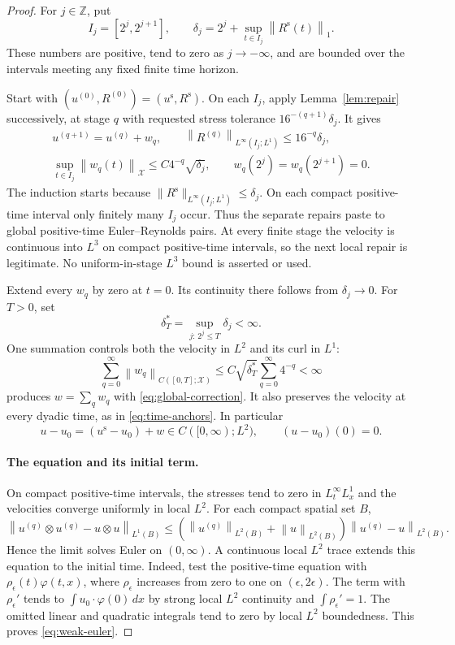\documentclass[11pt,a4paper,reqno]{amsart}
\theoremstyle{plain}
\theoremstyle{definition}
\theoremstyle{remark}
\numberwithin{equation}{section}
\newcommand{\X}{\mathcal X}
\newcommand{\norm}[2]{\left\|#1\right\|_{#2}}
\newcommand{\dd}{\,dx}
\begin{document}
\begin{proof}
For $j\in\mathbb Z$, put
\[
 I_j=[2^j,2^{j+1}],\qquad
 \delta_j=2^j+\sup_{t\in I_j}\norm{R^{\mathrm s}(t)}1.
\]
These numbers are positive, tend to zero as $j\to-\infty$, and are
bounded over the intervals meeting any fixed finite time horizon.

Start with $(u^{(0)},R^{(0)})=(u^{\mathrm s},R^{\mathrm s})$.
On each $I_j$, apply Lemma~\ref{lem:repair} successively, at stage $q$
with requested stress tolerance $16^{-(q+1)}\delta_j$. It gives
\begin{equation}\label{eq:dyadic-induction}
 \begin{gathered}
 u^{(q+1)}=u^{(q)}+w_q,\qquad
 \norm{R^{(q)}}{L^\infty(I_j;L^1)}\le16^{-q}\delta_j,\\
 \sup_{t\in I_j}\norm{w_q(t)}\X\le C4^{-q}\sqrt{\delta_j},
 \qquad w_q(2^j)=w_q(2^{j+1})=0.
 \end{gathered}
\end{equation}
The induction starts because $\|R^{\mathrm s}\|_{L^\infty(I_j;L^1)}
\le \delta_j$. On each compact positive-time interval only finitely many
$I_j$ occur. Thus the separate repairs paste to global positive-time
Euler--Reynolds pairs. At every finite stage the velocity is continuous
into $L^3$ on compact positive-time intervals, so the next local repair
is legitimate. No uniform-in-stage $L^3$ bound is asserted or used.

Extend every $w_q$ by zero at $t=0$. Its continuity there follows from
$\delta_j\to0$. For $T>0$, set
\[
 \delta_T^*=\sup_{j:\,2^j\le T}\delta_j<\infty.
\]
One summation controls both the velocity in $L^2$ and its curl in
$L^1$:
\begin{equation}\label{eq:graph-summation}
 \sum_{q=0}^\infty\norm{w_q}{C([0,T];\X)}
 \le C\sqrt{\delta_T^*}\sum_{q=0}^\infty4^{-q}<\infty
\end{equation}
produces $w=\sum_qw_q$ with \eqref{eq:global-correction}.
It also preserves the velocity at every dyadic time, as in
\eqref{eq:time-anchors}.
In particular
\[
 u-u_0=(u^{\mathrm s}-u_0)+w\in C([0,\infty);L^2),
 \qquad (u-u_0)(0)=0.
\]

\paragraph{The equation and its initial term.}
On compact positive-time intervals, the stresses tend to zero in
$L^\infty_tL^1_x$ and the velocities converge uniformly in local
$L^2$. For each compact spatial set $B$,
\[
 \norm{u^{(q)}\otimes u^{(q)}-u\otimes u}{L^1(B)}
 \le\left(\norm{u^{(q)}}{L^2(B)}+\norm u{L^2(B)}\right)
                      \norm{u^{(q)}-u}{L^2(B)}.
\]
Hence the limit solves Euler on $(0,\infty)$.
A continuous local $L^2$ trace extends this equation to the initial
time. Indeed, test the positive-time equation with
$\rho_\epsilon(t)\varphi(t,x)$, where $\rho_\epsilon$ increases from
zero to one on $(\epsilon,2\epsilon)$. The term with
$\rho_\epsilon'$ tends to
$\int u_0\cdot\varphi(0)\dd$ by strong local $L^2$ continuity and
$\int\rho_\epsilon'=1$. The omitted linear and quadratic integrals
tend to zero by local $L^2$ boundedness. This proves
\eqref{eq:weak-euler}.


\end{proof}
\end{document}
